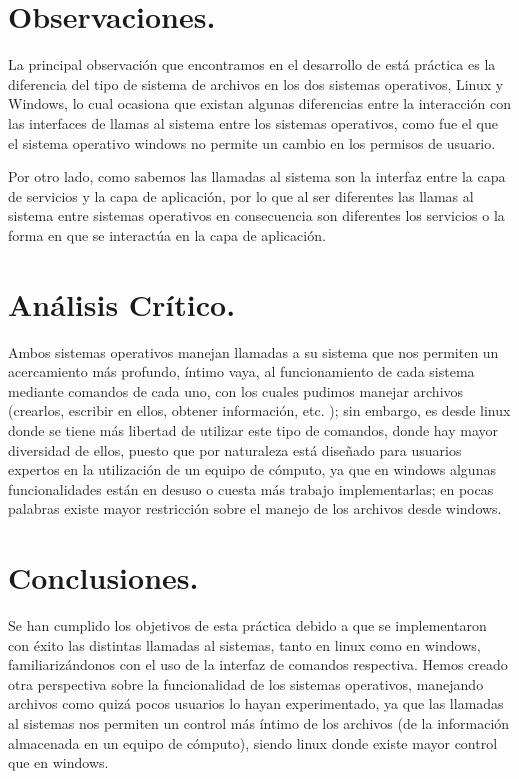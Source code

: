 \documentclass[12pt]{article}
\begin{document}
     \newpage
\section{Observaciones.}

La principal observación que encontramos en el desarrollo de está práctica es la diferencia del tipo de sistema de archivos en los dos sistemas operativos, Linux y Windows, lo cual ocasiona que existan algunas diferencias entre la interacción con las interfaces de llamas al sistema entre los sistemas operativos, como fue el que el sistema operativo windows no permite un cambio en los permisos de usuario. 

Por otro lado, como sabemos las llamadas al sistema son la interfaz entre la capa de servicios y la capa de aplicación, por lo que al ser diferentes las llamas al sistema entre sistemas operativos en  consecuencia son diferentes los servicios o la forma en que se interactúa en la capa de aplicación.
\section{Análisis Crítico.}
Ambos sistemas operativos manejan llamadas a su sistema que nos permiten un acercamiento más profundo, íntimo vaya, al funcionamiento de cada sistema mediante comandos de cada uno, con los cuales pudimos manejar archivos (crearlos, escribir en ellos, obtener información, etc. ); sin embargo, es desde linux donde se tiene más libertad de utilizar este tipo de comandos, donde hay mayor diversidad de ellos, puesto que por naturaleza está diseñado para usuarios expertos en la utilización de un equipo de cómputo, ya que en windows algunas funcionalidades están en desuso o cuesta más trabajo implementarlas; en pocas palabras existe mayor restricción sobre el manejo de los archivos desde windows.
\section{Conclusiones.}
Se han cumplido los objetivos de esta práctica debido a que se implementaron con éxito las distintas llamadas al sistemas, tanto en linux como en windows, familiarizándonos con el uso de la interfaz de comandos respectiva. Hemos creado otra perspectiva sobre la funcionalidad de los sistemas operativos, manejando archivos como quizá pocos usuarios lo hayan experimentado, ya que las llamadas al sistemas nos permiten un control más íntimo de los archivos (de la información almacenada en un equipo de cómputo), siendo linux donde existe mayor control que en windows.
\end{document}
